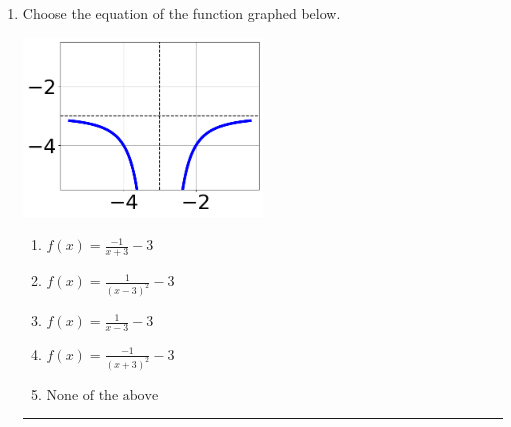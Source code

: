 \documentclass[14pt]{extbook}
\newcommand{\litem}[1]{\item#1\hspace*{-1cm}\rule{\textwidth}{0.4pt}}
\begin{document}
\begin{enumerate}
{\begin{enumerate}[label=\Alph*.]
\end{enumerate} }
\litem{
Choose the equation of the function graphed below.
\begin{center}
    \includegraphics[width=0.5\textwidth]{../Figures/rationalGraphToEquationCopyC.png}
\end{center}
\begin{enumerate}[label=\Alph*.]
\item \( f(x) = \frac{-1}{x + 3} - 3 \)
\item \( f(x) = \frac{1}{(x - 3)^2} - 3 \)
\item \( f(x) = \frac{1}{x - 3} - 3 \)
\item \( f(x) = \frac{-1}{(x + 3)^2} - 3 \)
\item \( \text{None of the above} \)


\end{enumerate}}
\end{enumerate}
\end{document}
